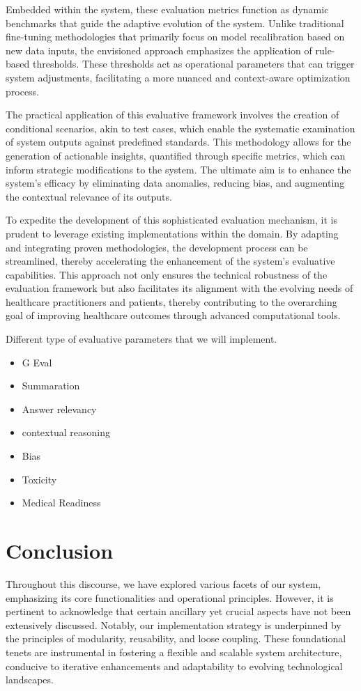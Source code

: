 \documentclass{article}
\begin{document}
Embedded within the system, these evaluation metrics function as dynamic benchmarks that guide the adaptive evolution of the system. Unlike traditional fine-tuning methodologies that primarily focus on model recalibration based on new data inputs, the envisioned approach emphasizes the application of rule-based thresholds. These thresholds act as operational parameters that can trigger system adjustments, facilitating a more nuanced and context-aware optimization process.

The practical application of this evaluative framework involves the creation of conditional scenarios, akin to test cases, which enable the systematic examination of system outputs against predefined standards. This methodology allows for the generation of actionable insights, quantified through specific metrics, which can inform strategic modifications to the system. The ultimate aim is to enhance the system's efficacy by eliminating data anomalies, reducing bias, and augmenting the contextual relevance of its outputs.

To expedite the development of this sophisticated evaluation mechanism, it is prudent to leverage existing implementations within the domain. By adapting and integrating proven methodologies, the development process can be streamlined, thereby accelerating the enhancement of the system's evaluative capabilities. This approach not only ensures the technical robustness of the evaluation framework but also facilitates its alignment with the evolving needs of healthcare practitioners and patients, thereby contributing to the overarching goal of improving healthcare outcomes through advanced computational tools.

Different type of evaluative parameters that we will implement.
\begin{itemize}
	\item G Eval
	\item Summaration
	\item Answer relevancy 
	\item contextual reasoning
	\item Bias 
	\item Toxicity
	\item Medical Readiness
\end{itemize}

\section{Conclusion}

Throughout this discourse, we have explored various facets of our system, emphasizing its core functionalities and operational principles. However, it is pertinent to acknowledge that certain ancillary yet crucial aspects have not been extensively discussed. Notably, our implementation strategy is underpinned by the principles of modularity, reusability, and loose coupling. These foundational tenets are instrumental in fostering a flexible and scalable system architecture, conducive to iterative enhancements and adaptability to evolving technological landscapes.
\end{document}
